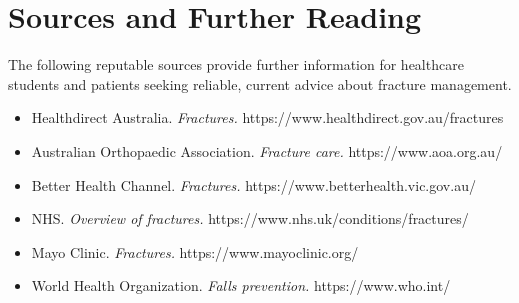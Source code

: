 \section*{Sources and Further Reading}
The following reputable sources provide further information for healthcare students and patients seeking reliable, current advice about fracture management.
\begin{itemize}
    \item Healthdirect Australia. \textit{Fractures.} https://www.healthdirect.gov.au/fractures
    \item Australian Orthopaedic Association. \textit{Fracture care.} https://www.aoa.org.au/
    \item Better Health Channel. \textit{Fractures.} https://www.betterhealth.vic.gov.au/
    \item NHS. \textit{Overview of fractures.} https://www.nhs.uk/conditions/fractures/
    \item Mayo Clinic. \textit{Fractures.} https://www.mayoclinic.org/
    \item World Health Organization. \textit{Falls prevention.} https://www.who.int/
\end{itemize}
